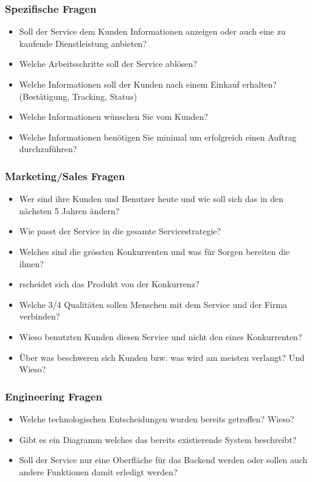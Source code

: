 \subsubsection{Spezifische Fragen}
\begin{itemize}
  \item Soll der Service dem Kunden Informationen anzeigen oder auch eine zu kaufende Dienstleistung anbieten?
  \item Welche Arbeitsschritte soll der Service ablösen?
  \item Welche Informationen soll der Kunden nach einem Einkauf erhalten? (Bestätigung, Tracking, Status)
  \item Welche Informationen wünschen Sie vom Kunden?
  \item Welche Informationen benötigen Sie minimal um erfolgreich einen Auftrag durchzuführen?
\end{itemize}

\subsubsection{Marketing/Sales Fragen}
\begin{itemize}
  \item Wer sind ihre Kunden und Benutzer heute und wie soll sich das in den nächsten 5 Jahren ändern?
  \item Wie passt der Service in die gesamte Servicestrategie?
  \item Welches sind die grössten Konkurrenten und was für Sorgen bereiten die ihnen?
  \item rscheidet sich das Produkt von der Konkurrenz?
  \item Welche 3/4 Qualitäten sollen Menschen mit dem Service und der Firma verbinden?
  \item Wieso benutzten Kunden diesen Service und nicht den eines Konkurrenten?
  \item Über was beschweren sich Kunden bzw. was wird am meisten verlangt? Und Wieso?
\end{itemize}

\subsubsection{Engineering Fragen}
\begin{itemize}
  \item Welche technologischen Entscheidungen wurden bereits getroffen? Wieso?
  \item Gibt es ein Diagramm welches das bereits existierende System beschreibt?
  \item Soll der Service nur eine Oberfläche für das Backend werden oder sollen auch andere Funktionen damit erledigt werden?
\end{itemize}


